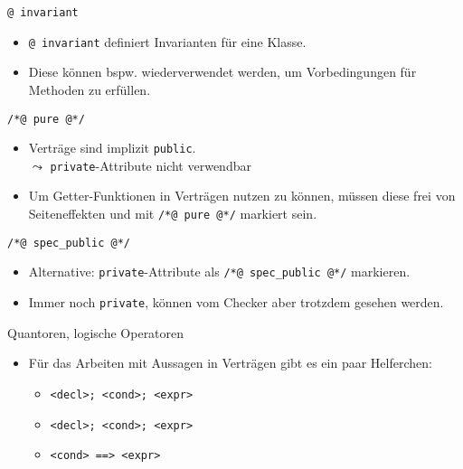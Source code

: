 \documentclass{beamer}
\begin{document}
\begin{frame}{\texttt{@ invariant}}

	\begin{itemize}
		\item \texttt{@ invariant} definiert Invarianten für eine Klasse.
		\item Diese können bspw. wiederverwendet werden, um Vorbedingungen für Methoden zu erfüllen.
	\end{itemize}
\end{frame}

\begin{frame}{\texttt{/*@ pure @*/}}

	\begin{itemize}
		\item Verträge sind implizit \texttt{public}.\\
		$\leadsto$ \texttt{private}-Attribute nicht verwendbar
		\item Um Getter-Funktionen in Verträgen nutzen zu können, müssen diese frei von Seiteneffekten und mit \texttt{/*@ pure @*/} markiert sein.
	\end{itemize}
\end{frame}

\begin{frame}{\texttt{/*@ spec\_public @*/}}

	\begin{itemize}
		\item Alternative: \texttt{private}-Attribute als \texttt{/*@ spec\_public @*/} markieren.
		\item Immer noch \texttt{private}, können vom Checker aber trotzdem gesehen werden.
	\end{itemize}
\end{frame}

\begin{frame}{Quantoren, logische Operatoren}

	\begin{itemize}
		\item Für das Arbeiten mit Aussagen in Verträgen gibt es ein paar Helferchen:
		\begin{itemize}
			\item \texttt{\string\forall <decl>; <cond>; <expr>}
			\item \texttt{\string\exists <decl>; <cond>; <expr>}
			\item \texttt{<cond> ==> <expr>}
		\end{itemize}
	\end{itemize}
\end{frame}
\end{document}
